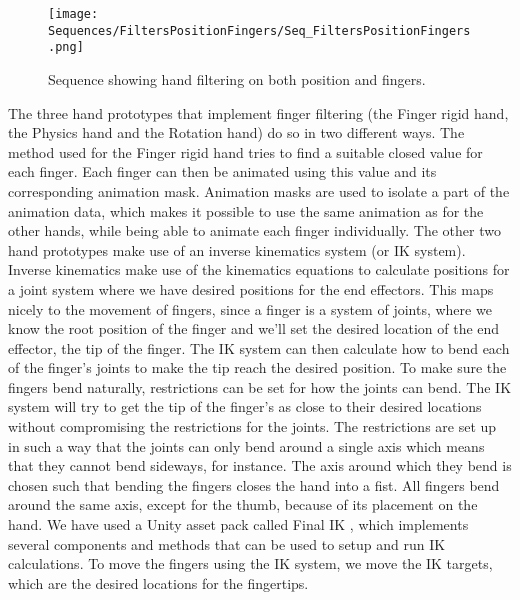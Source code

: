 
\begin{figure}[H]
\centering
\texttt{[image: Sequences/FiltersPositionFingers/Seq\_FiltersPositionFingers.png]}
\caption{Sequence showing hand filtering on both position and fingers.}
\label{fig:filtersPositionFingers}
\end{figure}

The three hand prototypes that implement finger filtering (the Finger rigid hand, the Physics hand and the Rotation hand) do so in two different ways. The method used for the Finger rigid hand tries to find a suitable closed value for each finger. Each finger can then be animated using this value and its corresponding animation mask. Animation masks are used to isolate a part of the animation data, which makes it possible to use the same animation as for the other hands, while being able to animate each finger individually. The other two hand prototypes make use of an inverse kinematics system (or IK system). Inverse kinematics make use of the kinematics equations to calculate positions for a joint system where we have desired positions for the end effectors. This maps nicely to the movement of fingers, since a finger is a system of joints, where we know the root position of the finger and we'll set the desired location of the end effector, the tip of the finger. The IK system can then calculate how to bend each of the finger's joints to make the tip reach the desired position. To make sure the fingers bend naturally, restrictions can be set for how the joints can bend. The IK system will try to get the tip of the finger's as close to their desired locations without compromising the restrictions for the joints. The restrictions are set up in such a way that the joints can only bend around a single axis which means that they cannot bend sideways, for instance. The axis around which they bend is chosen such that bending the fingers closes the hand into a fist. All fingers bend around the same axis, except for the thumb, because of its placement on the hand. We have used a Unity asset pack called Final IK \parencite{RootMotion2017}, which implements several components and methods that can be used to setup and run IK calculations. To move the fingers using the IK system, we move the IK targets, which are the desired locations for the fingertips.

